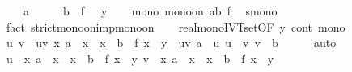 \begin{isabellebody}
\ \ \ {\isachardoublequoteopen}{\isasymexists}{\isacharbang}{\kern0pt}{\isasymxi}{\isachardot}{\kern0pt}\ a\ {\isasymle}\ {\isasymxi}\ {\isasymand}\ {\isasymxi}\ {\isasymle}\ b\ {\isasymand}\ f\ {\isasymxi}\ {\isacharequal}{\kern0pt}\ y{\isachardoublequoteclose}\isanewline
%
\isadelimproof
%
\endisadelimproof
%
\isatagproof
{}\isamarkupfalse%
{\isacharminus}{\kern0pt}\isanewline
\ \ \isamarkupfalse%
\ mono{\isacharcolon}{\kern0pt}\ {\isachardoublequoteopen}mono{\isacharunderscore}{\kern0pt}on\ {\isacharbraceleft}{\kern0pt}a{\isachardot}{\kern0pt}{\isachardot}{\kern0pt}b{\isacharbraceright}{\kern0pt}\ f{\isachardoublequoteclose}\ \isamarkupfalse%
\ smono\ \isamarkupfalse%
\ {\isacharparenleft}{\kern0pt}fact\ strict{\isacharunderscore}{\kern0pt}mono{\isacharunderscore}{\kern0pt}on{\isacharunderscore}{\kern0pt}imp{\isacharunderscore}{\kern0pt}mono{\isacharunderscore}{\kern0pt}on{\isacharparenright}{\kern0pt}\isanewline
\ \ \isamarkupfalse%
\ real{\isacharunderscore}{\kern0pt}mono{\isacharunderscore}{\kern0pt}IVT{\isacharprime}{\kern0pt}{\isacharunderscore}{\kern0pt}set{\isacharbrackleft}{\kern0pt}OF\ y\ cont\ mono{\isacharbrackright}{\kern0pt}\isanewline
\ \ \isamarkupfalse%
\ u\ v\ \ uv{\isacharcolon}{\kern0pt}\ {\isachardoublequoteopen}{\isacharbraceleft}{\kern0pt}x{\isachardot}{\kern0pt}\ a\ {\isasymle}\ x\ {\isasymand}\ x\ {\isasymle}\ b\ {\isasymand}\ f\ x\ {\isacharequal}{\kern0pt}\ y{\isacharbraceright}{\kern0pt}\ {\isacharequal}{\kern0pt}\ {\isacharbraceleft}{\kern0pt}u{\isachardot}{\kern0pt}{\isachardot}{\kern0pt}v{\isacharbraceright}{\kern0pt}{\isachardoublequoteclose}\ {\isachardoublequoteopen}a\ {\isasymle}\ u{\isachardoublequoteclose}\ {\isachardoublequoteopen}u\ {\isasymle}\ v{\isachardoublequoteclose}\ {\isachardoublequoteopen}v\ {\isasymle}\ b{\isachardoublequoteclose}\isanewline
\ \ \ \ \isamarkupfalse%
\ auto\isanewline
\ \ \isamarkupfalse%
\ {\isachardoublequoteopen}u\ {\isasymin}\ {\isacharbraceleft}{\kern0pt}x{\isachardot}{\kern0pt}\ a\ {\isasymle}\ x\ {\isasymand}\ x\ {\isasymle}\ b\ {\isasymand}\ f\ x\ {\isacharequal}{\kern0pt}\ y{\isacharbraceright}{\kern0pt}{\isachardoublequoteclose}\ {\isachardoublequoteopen}v\ {\isasymin}\ {\isacharbraceleft}{\kern0pt}x{\isachardot}{\kern0pt}\ a\ {\isasymle}\ x\ {\isasymand}\ x\ {\isasymle}\ b\ {\isasymand}\ f\ x\ {\isacharequal}{\kern0pt}\ y{\isacharbraceright}{\kern0pt}{\isachardoublequoteclose}\isanewline

\end{isabellebody}
